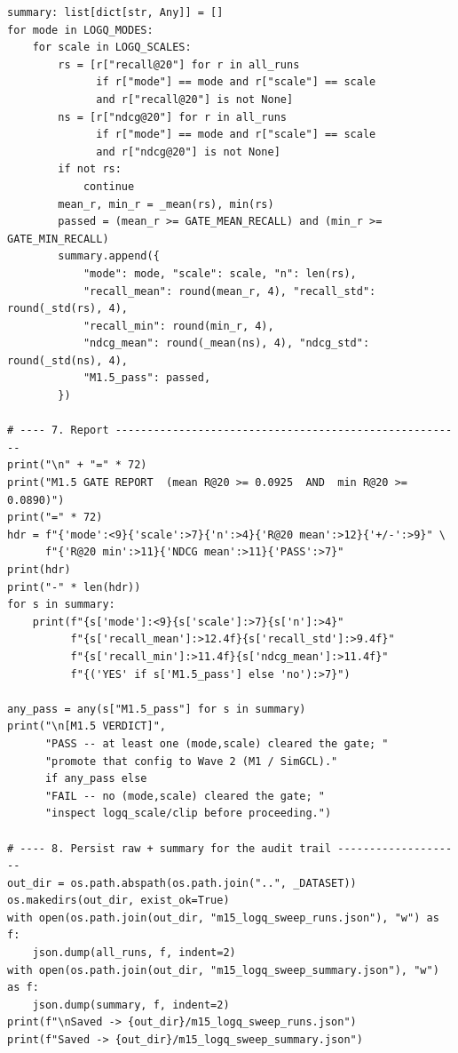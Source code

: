 \documentclass[11pt, a4paper]{article}
\begin{document}
\begin{lstlisting}[style=py, caption={M1.5 sweep driver: logq\_scale $\times$ logq\_mode $\times$ seed.}]
summary: list[dict[str, Any]] = []
for mode in LOGQ_MODES:
    for scale in LOGQ_SCALES:
        rs = [r["recall@20"] for r in all_runs
              if r["mode"] == mode and r["scale"] == scale
              and r["recall@20"] is not None]
        ns = [r["ndcg@20"] for r in all_runs
              if r["mode"] == mode and r["scale"] == scale
              and r["ndcg@20"] is not None]
        if not rs:
            continue
        mean_r, min_r = _mean(rs), min(rs)
        passed = (mean_r >= GATE_MEAN_RECALL) and (min_r >= GATE_MIN_RECALL)
        summary.append({
            "mode": mode, "scale": scale, "n": len(rs),
            "recall_mean": round(mean_r, 4), "recall_std": round(_std(rs), 4),
            "recall_min": round(min_r, 4),
            "ndcg_mean": round(_mean(ns), 4), "ndcg_std": round(_std(ns), 4),
            "M1.5_pass": passed,
        })

# ---- 7. Report -------------------------------------------------------
print("\n" + "=" * 72)
print("M1.5 GATE REPORT  (mean R@20 >= 0.0925  AND  min R@20 >= 0.0890)")
print("=" * 72)
hdr = f"{'mode':<9}{'scale':>7}{'n':>4}{'R@20 mean':>12}{'+/-':>9}" \
      f"{'R@20 min':>11}{'NDCG mean':>11}{'PASS':>7}"
print(hdr)
print("-" * len(hdr))
for s in summary:
    print(f"{s['mode']:<9}{s['scale']:>7}{s['n']:>4}"
          f"{s['recall_mean']:>12.4f}{s['recall_std']:>9.4f}"
          f"{s['recall_min']:>11.4f}{s['ndcg_mean']:>11.4f}"
          f"{('YES' if s['M1.5_pass'] else 'no'):>7}")

any_pass = any(s["M1.5_pass"] for s in summary)
print("\n[M1.5 VERDICT]",
      "PASS -- at least one (mode,scale) cleared the gate; "
      "promote that config to Wave 2 (M1 / SimGCL)."
      if any_pass else
      "FAIL -- no (mode,scale) cleared the gate; "
      "inspect logq_scale/clip before proceeding.")

# ---- 8. Persist raw + summary for the audit trail --------------------
out_dir = os.path.abspath(os.path.join("..", _DATASET))
os.makedirs(out_dir, exist_ok=True)
with open(os.path.join(out_dir, "m15_logq_sweep_runs.json"), "w") as f:
    json.dump(all_runs, f, indent=2)
with open(os.path.join(out_dir, "m15_logq_sweep_summary.json"), "w") as f:
    json.dump(summary, f, indent=2)
print(f"\nSaved -> {out_dir}/m15_logq_sweep_runs.json")
print(f"Saved -> {out_dir}/m15_logq_sweep_summary.json")
\end{lstlisting}
\end{document}
